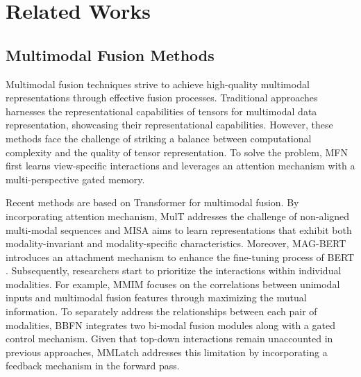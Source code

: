 \documentclass[letterpaper]{article}
\begin{document}
\section{Related Works}
\subsection{Multimodal Fusion Methods}
Multimodal fusion techniques strive to achieve high-quality multimodal representations through effective fusion processes. Traditional approaches \cite{zadeh2017tensor, liu2018efficient, hou2019deep} harnesses the representational capabilities of tensors for multimodal data representation, showcasing their representational capabilities. However, these methods face the challenge of striking a balance between computational complexity and the quality of tensor representation. To solve the problem, MFN \cite{zadeh2018memory} first learns view-specific interactions and leverages an attention mechanism with a multi-perspective gated memory.

Recent methods are based on Transformer for multimodal fusion. By incorporating attention mechanism, MulT \cite{tsai2019multimodal} addresses the challenge of non-aligned multi-modal sequences and MISA \cite{10.1145/3394171.3413678} aims to learn representations that exhibit both modality-invariant and modality-specific characteristics. Moreover, MAG-BERT \cite{rahman2020integrating} introduces an attachment mechanism to enhance the fine-tuning process of BERT \cite{devlin2018bert}. Subsequently, researchers start to prioritize the interactions within individual modalities. For example, MMIM \cite{han2021improving} focuses on the correlations between unimodal inputs and multimodal fusion features through maximizing the mutual information. To separately address the relationships between each pair of modalities, BBFN \cite{han2021bi} integrates two bi-modal fusion modules along with a gated control mechanism. Given that top-down interactions remain unaccounted in previous approaches, MMLatch \cite{paraskevopoulos2022mmlatch} addresses this limitation by incorporating a feedback mechanism in the forward pass.
\end{document}
